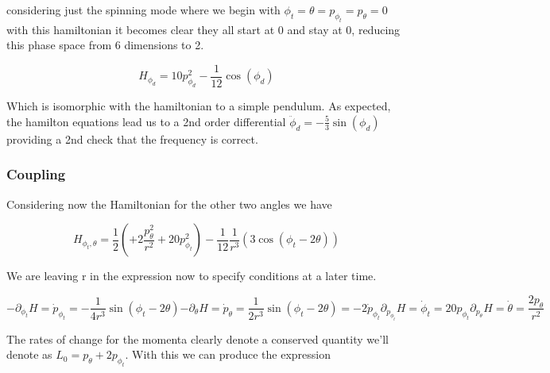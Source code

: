 \documentclass[12pt]{amsart}
\begin{document}
considering just the spinning mode where we begin with $\phi_t=\theta=p_{\phi_t}=p_\theta=0$ with this hamiltonian it becomes clear they all start at 0 and stay at 0, reducing this phase space from 6 dimensions to 2.

\begin{equation}
	H_{\phi_d}=
	10 p_{\phi_d}^2 
	-
	\frac{1}{12}
        \cos(\phi_d)
\end{equation}

Which is isomorphic with the hamiltonian to a simple pendulum. As expected, the hamilton equations lead us to  a 2nd order differential $\ddot \phi_d = - \frac{5}{3}\sin(\phi_d)$ providing a 2nd check that the frequency is correct.

\subsubsection{Coupling}

Considering now the Hamiltonian for the other two angles we have

\begin{equation}
	H_{\phi_t, \theta}=
	\frac{1}{2}\left (
	+2 \frac{p_\theta^2}{r^2}
	+20 p_{\phi_t}^2 
        \right )
	-
	\frac{1}{12}
	\frac{1}{r^3}(
	        3\cos(\phi_t-2\theta)
	    )
\end{equation}

We are leaving r in the expression now to specify conditions at a later time.

\begin{subequations}
	\begin{equation}
		-\partial_{\phi_t}H= \dot p_{\phi_t} 
		= - \frac{1}{4 r^{3}} \sin{\left (\phi_{t} - 2 \theta \right )}
	\end{equation}
	\begin{equation}
		-\partial_{\theta}H= \dot p_{\theta}  
		= \frac{1}{2 r^{3}} \sin{\left (\phi_{t} - 2 \theta \right )}=-2\dot p_{\phi_t}
	\end{equation}
	\begin{equation}
		\partial_{p_{\phi_t}}H= \dot \phi_t 
		= 20 p_{\phi_t}
	\end{equation}
	\begin{equation}
		\partial_{p_{\theta}}H= \dot \theta 
		= \frac{2 p_{\theta}}{r^{2}}
	\end{equation}
\end{subequations}

The rates of change for the momenta clearly denote a conserved quantity we'll denote as $L_0 = p_\theta + 2p_{\phi_t}$. With this we can produce the expression
\end{document}
